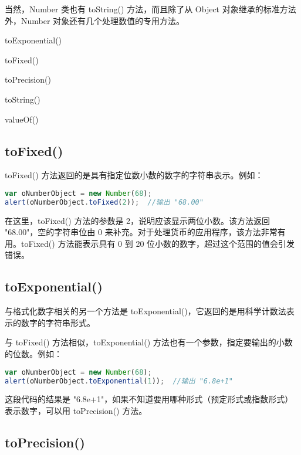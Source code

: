 当然，Number 类也有 toString() 方法，而且除了从 Object 对象继承的标准方法外，Number 对象还有几个处理数值的专用方法。

\begin{compactitem}
\item toExponential()
\item toFixed()
\item toPrecision()
\item toString()
\item valueOf()
\end{compactitem}



\subsection{toFixed()}

toFixed() 方法返回的是具有指定位数小数的数字的字符串表示。例如：


\begin{lstlisting}[language=JavaScript]
var oNumberObject = new Number(68);
alert(oNumberObject.toFixed(2));  //输出 "68.00"
\end{lstlisting}

在这里，toFixed() 方法的参数是 2，说明应该显示两位小数。该方法返回 "68.00"，空的字符串位由 0 来补充。对于处理货币的应用程序，该方法非常有用。toFixed() 方法能表示具有 0 到 20 位小数的数字，超过这个范围的值会引发错误。

\subsection{toExponential()}

与格式化数字相关的另一个方法是 toExponential()，它返回的是用科学计数法表示的数字的字符串形式。

与 toFixed() 方法相似，toExponential() 方法也有一个参数，指定要输出的小数的位数。例如：

\begin{lstlisting}[language=JavaScript]
var oNumberObject = new Number(68);
alert(oNumberObject.toExponential(1));  //输出 "6.8e+1"
\end{lstlisting}

这段代码的结果是 "6.8e+1"，如果不知道要用哪种形式（预定形式或指数形式）表示数字，可以用 toPrecision() 方法。




\subsection{toPrecision()}




